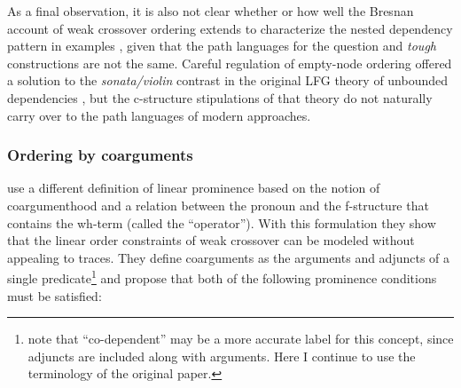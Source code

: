 \documentclass[output=paper,hidelinks]{langscibook}
\begin{document}
As a final observation, it is also not clear whether or how well the Bresnan account of weak crossover ordering extends to characterize the nested dependency pattern in examples , given that the path languages for the question and \textit{tough} constructions are not the same. Careful regulation of empty-node ordering offered a solution to the \textit{sonata/violin} contrast in the original LFG theory of unbounded dependencies \citep{kaplanbresnan82}, but the c-structure stipulations of that theory do not naturally carry over to the path languages of modern approaches.

%
%
%

\subsubsection{Ordering by coarguments}

\citet{dalrympleetal2001} use a different definition of linear prominence based on the notion of coargumenthood and a relation between the pronoun and the f-structure that contains the wh-term (called the ``operator''). With this formulation they show that the linear order constraints of weak crossover can be modeled without appealing to traces. They define coarguments as the arguments and adjuncts of a single predicate\footnote{\citet{DLM:LFG} note that ``co-dependent'' may be a more accurate label for this concept, since adjuncts are included along with arguments.  Here I continue to use the terminology of the original paper.} and propose that both of the following prominence conditions must be satisfied:
\end{document}
